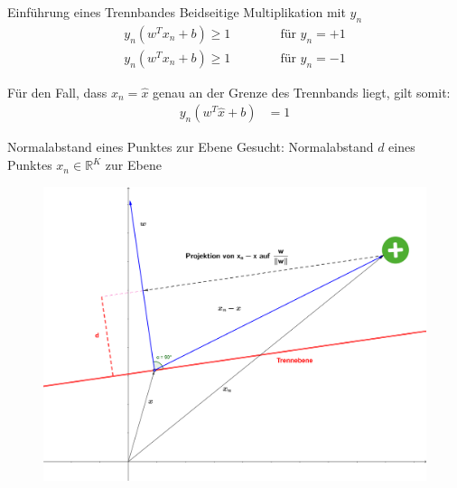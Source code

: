 \documentclass[ngerman]{beamer}
\begin{document}
\begin{frame}{Einführung eines Trennbandes}
	Beidseitige Multiplikation mit $y_{n}$
	\begin{subequations}
		\begin{alignat*}{2}
			y_{n} (w^{T} x_{n} + b) \geq 1 & \qquad & \text{ für } y_{n} = +1\\
			y_{n} (w^{T} x_{n} + b) \geq 1 & & \text{ für } y_{n} = -1
		\end{alignat*}
	\end{subequations}

	\pause 
	Für den Fall, dass $x_{n} = \hat{x}$ genau an der Grenze des Trennbands liegt, gilt somit:
	\begin{equation*}
		\begin{aligned}
			y_{n} (w^{T} \hat{x} + b) &= 1
		\end{aligned}
	\end{equation*}
\end{frame}



\begin{frame}{Normalabstand eines Punktes zur Ebene}
	Gesucht: Normalabstand $d$ eines Punktes $x_{n} \in \mathbb{R}^{K}$ zur Ebene \\
	
	\begin{center}
		\begin{figure}
			\includegraphics[width=\textwidth,height=0.8\textheight,keepaspectratio]{assets/projection.png}
		\end{figure}
	\end{center}
\end{frame}
\end{document}
